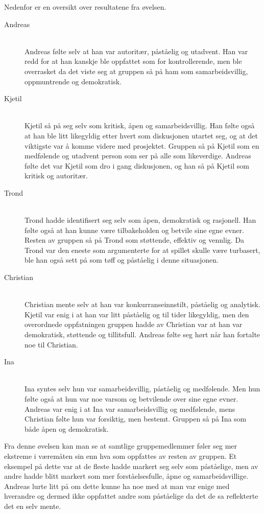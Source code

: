 Nedenfor er en oversikt over resultatene fra øvelsen.
\begin{description}
\item[Andreas] \hfill \\
Andreas følte selv at han var autoritær, påståelig og utadvent. Han var redd for at han kanskje ble oppfattet som for kontrollerende, men ble overrasket da det viste seg at gruppen så på ham som samarbeidsvillig, oppmuntrende og demokratisk. 

\item[Kjetil] \hfill \\
Kjetil så på seg selv som kritisk, åpen og samarbeidsvillig. Han følte også at han ble litt likegyldig etter hvert som diskusjonen utartet seg, og at det viktigste var å komme videre med prosjektet. Gruppen så på Kjetil som en medfølende og utadvent person som ser på alle som likeverdige. Andreas følte det var Kjetil som dro i gang diskusjonen, og han så på Kjetil som kritisk og autoritær.

\item[Trond] \hfill \\	
Trond hadde identifisert seg selv som åpen, demokratisk og rasjonell. Han følte også at han kunne være tilbakeholden og betvile sine egne evner. Resten av gruppen så på Trond som støttende, effektiv og vennlig. Da Trond var den eneste som argumenterte for at spillet skulle være turbasert, ble han også sett på som tøff og påståelig i denne situasjonen. 

\item[Christian] \hfill \\
Christian mente selv at han var konkurranseinnstilt, påståelig og analytisk. Kjetil var enig i at han var litt påståelig og til tider likegyldig, men den overordnede oppfatningen gruppen hadde av Christian var at han var demokratisk, støttende og tillitsfull. Andreas følte seg hørt når han fortalte noe til Christian.

\item[Ina] \hfill \\
Ina syntes selv hun var samarbeidsvillig, påståelig og medfølende. Men hun følte også at hun var noe varsom og betvilende over sine egne evner. Andreas var enig i at Ina var samarbeidsvillig og medfølende, mens Christian følte hun var forsiktig, men bestemt. Gruppen så på Ina som både åpen og demokratisk.  

\end{description}
Fra denne øvelsen kan man se at samtlige gruppemedlemmer føler seg mer
ekstreme i væremåten sin enn hva som oppfattes av resten av gruppen. Et
eksempel på dette var at de fleste hadde markert seg selv som
påståelige, men av andre hadde blitt markert som mer forståelsesfulle,
åpne og samarbeidsvillige. Andreas lurte litt på om dette kunne ha noe med
at man var enige med hverandre og dermed ikke oppfattet andre
som påståelige da det de sa reflekterte det en selv mente. 

